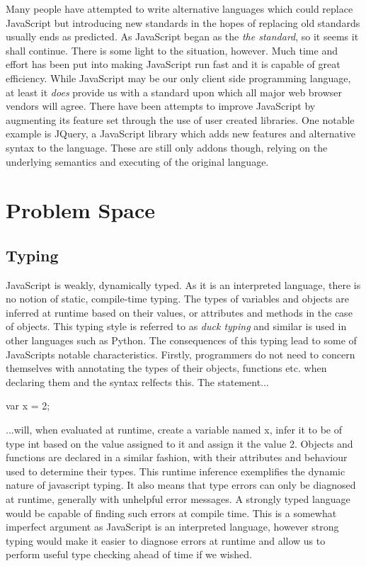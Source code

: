Many people have attempted to
write alternative languages which could replace JavaScript but 
introducing new standards in the hopes of replacing old standards
usually ends as predicted. As JavaScript began as the \emph{the
standard}, so it seems it shall continue. There is some light to the
situation, however. Much time and effort has been put into making 
JavaScript run fast and it is capable of great efficiency. While 
JavaScript may be our only client side programming language, at least
it \emph{does} provide us with a standard upon which all major web 
browser vendors will agree. There have been attempts
to improve JavaScript by augmenting its feature set through the use
of user created libraries. One notable example is JQuery, a JavaScript
library which adds new features and alternative syntax to the language.
These are still only addons though, relying on the underlying semantics
and executing of the original language. 

\pagebreak

\section{Problem Space}

\subsection{Typing}
JavaScript is weakly, dynamically typed. As it is an interpreted language,
there is no notion of static, compile-time typing. The types of variables
and objects are inferred at runtime based on their values, or attributes and
methods in the case of objects. This typing style is referred to as\emph{
duck typing} and similar is used in other languages such as Python. The
consequences of this typing lead to some of JavaScripts notable characteristics.
Firstly, programmers do not need to concern themselves with annotating the
types of their objects, functions etc. when declaring them and the syntax
relfects this. The statement...
\begin{center}
var x = 2;		
\end{center}
\noindent ...will, when evaluated at runtime, create a variable named x, infer
it to be of type int based on the value assigned to it and assign it the
value 2. Objects and functions are declared in a similar fashion, with their
attributes and behaviour used to determine their types. This runtime inference
exemplifies the dynamic nature of javascript typing. It also means that
type errors can only be diagnosed at runtime, generally with unhelpful 
error messages. A strongly typed language would be capable of finding such
errors at compile time. This is a somewhat imperfect argument as JavaScript
is an interpreted language, however strong typing would make it easier to
diagnose errors at runtime and allow us to perform useful type checking
ahead of time if we wished.

